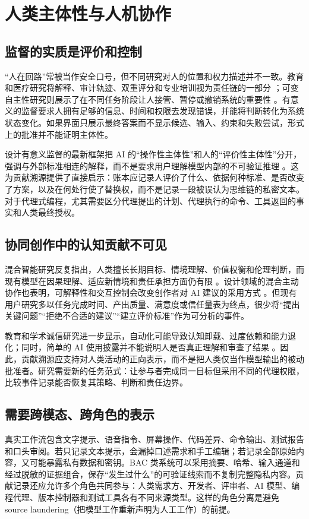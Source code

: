 \documentclass[UTF8,a4paper,12pt]{ctexart}
\begin{document}
\section{人类主体性与人机协作}
\subsection{监督的实质是评价和控制}
“人在回路”常被当作安全口号，但不同研究对人的位置和权力描述并不一致。教育和医疗研究将解释、审计轨迹、双重评分和专业培训视为责任链的一部分 \cite{humaninthe2025,prioritizinghumanai2026}；可变自主性研究则展示了在不同任务阶段让人接管、暂停或撤销系统的重要性 \cite{letmetake2021}。有意义的监督要求人拥有足够的信息、时间和权限去发现错误，并能将判断转化为系统状态变化。如果界面只展示最终答案而不显示候选、输入、约束和失败尝试，形式上的批准并不能证明主体性。

设计有意义监督的最新框架把 AI 的“操作性主体性”和人的“评价性主体性”分开，强调与外部标准相连的解释，而不是要求用户理解模型内部的不可验证推理 \cite{designingmeaningfulhuman2026}。这为贡献溯源提供了直接启示：账本应记录人评价了什么、依据何种标准、是否改变了方案，以及在何处行使了替换权，而不是记录一段被误认为思维链的私密文本。对于代理式编程，尤其需要区分代理提出的计划、代理执行的命令、工具返回的事实和人类最终授权。

\subsection{协同创作中的认知贡献不可见}
混合智能研究反复指出，人类擅长长期目标、情境理解、价值权衡和伦理判断，而现有模型在因果理解、适应新情境和责任承担方面仍有限 \cite{hybridintelligencehuman2025,towardascience2026}。设计领域的混合主动协作也表明，可解释性和交互控制会改变创作者对 AI 建议的采用方式 \cite{generativeaiin2025}。但现有用户研究多以任务完成时间、产出质量、满意度或信任量表为终点，很少将“提出关键问题”“拒绝不合适的建议”“建立评价标准”作为可分析的事件。

教育和学术诚信研究进一步显示，自动化可能导致认知卸载、过度依赖和能力退化；同时，简单的 AI 使用披露并不能说明人是否真正理解和审查了结果 \cite{artificialintelligenceimplications2023,ethicalproblemsin2025,asurveyon2023}。因此，贡献溯源应支持对人类活动的正向表示，而不是把人类仅当作模型输出的被动批准者。研究需要新的任务范式：让参与者完成同一目标但采用不同的代理权限，比较事件记录能否恢复其策略、判断和责任边界。

\subsection{需要跨模态、跨角色的表示}
真实工作流包含文字提示、语音指令、屏幕操作、代码差异、命令输出、测试报告和口头审阅。若只记录文本提示，会漏掉口述需求和手工编辑；若记录全部原始内容，又可能暴露私有数据和密钥。BAC 类系统可以采用摘要、哈希、输入通道和经过脱敏的证据组合，保存“发生过什么”的可验证线索而不复制完整隐私内容。贡献记录还应允许多个角色共同参与：人类需求方、开发者、评审者、AI 模型、编程代理、版本控制器和测试工具各有不同来源类型。这样的角色分离是避免 source laundering（把模型工作重新声明为人工工作）的前提。
\end{document}
